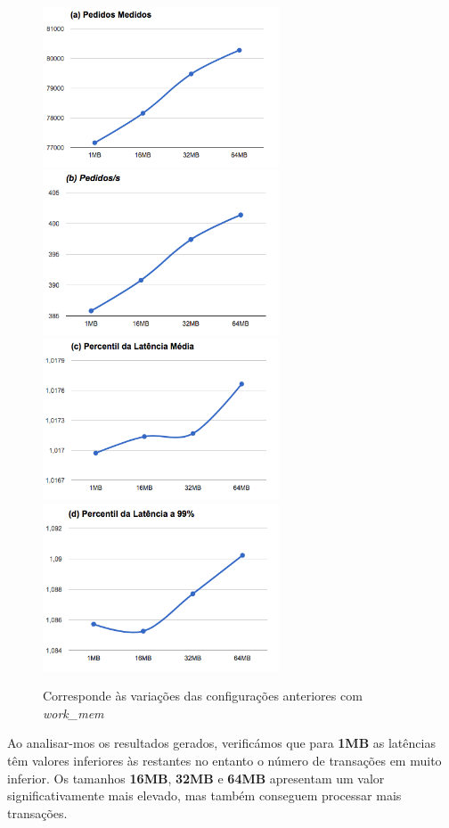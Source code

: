 \begin{figure}[ht!]
\centering
\includegraphics[width=70mm]{img/questao_3/sb_ecs_cs_vacuum_rpc_wm_a.png}
\includegraphics[width=70mm]{img/questao_3/sb_ecs_cs_vacuum_rpc_wm_b.png}
\includegraphics[width=70mm]{img/questao_3/sb_ecs_cs_vacuum_rpc_wm_c.png}
\includegraphics[width=70mm]{img/questao_3/sb_ecs_cs_vacuum_rpc_wm_d.png}
\caption{Corresponde às variações das configurações anteriores com \textit{work\_mem}}
\end{figure}

Ao analisar-mos os resultados gerados, verificámos que para \textbf{1MB} as latências têm valores inferiores às restantes no entanto o número de transações em muito inferior. Os tamanhos \textbf{16MB}, \textbf{32MB} e \textbf{64MB} apresentam um valor significativamente mais elevado, mas também conseguem processar mais transações.

